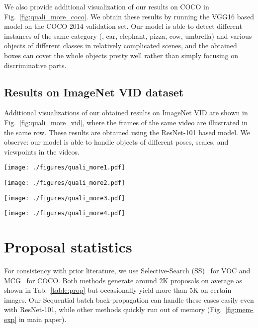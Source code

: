 \documentclass[10pt,twocolumn,letterpaper]{article}
\begin{document}
We also provide additional visualization of our results on COCO in Fig.~\ref{fig:quali_more_coco}. We obtain these results by running the VGG16 based model on the COCO 2014 validation set. Our model is able to detect different instances of the same category (\eg, car, elephant, pizza, cow, umbrella) and various objects of different classes in relatively complicated scenes, and the obtained boxes can cover the whole objects pretty well rather than simply focusing on discriminative parts.

\subsection{Results on ImageNet VID dataset}
Additional visualizations of our obtained results on ImageNet VID are shown in Fig.~\ref{fig:quali_more_vid}, where the frames of the same video are illustrated in the same row. These results are obtained using the ResNet-101 based model. We observe: our model is able to handle objects of different poses, scales, and viewpoints in the videos. 

\begin{figure*}[t]
\centering
\texttt{[image: ./figures/quali\_more1.pdf]}
\caption{Examples that highlight cases of `Instance Ambiguity'. For every pair: baseline (left) and our model (right).}
\label{fig:quali_more_inst}
\end{figure*}

\begin{figure*}[t]
\centering
\texttt{[image: ./figures/quali\_more2.pdf]}
\caption{Examples that highlight cases of `Part Domination'. For every pair: baseline (left) and our model (right).}
\label{fig:quali_more_part}
\end{figure*}

\begin{figure*}[t]
\centering
\texttt{[image: ./figures/quali\_more3.pdf]}
\caption{Additional visualization results of the proposed method on the COCO2014 validation set.}
\label{fig:quali_more_coco}
\end{figure*}

\begin{figure*}[t]
\centering
\texttt{[image: ./figures/quali\_more4.pdf]}
\caption{Additional visualization results of the proposed method on the ImageNet VID validation set.}
\label{fig:quali_more_vid}
\end{figure*}

\section{Proposal statistics}
For consistency with prior literature, we use Selective-Search (SS)~\cite{ss} for VOC and MCG~\cite{mcg} for COCO. Both methods generate around 2K proposals on average as shown in Tab.~\ref{table:prop} but occasionally yield more than 5K on certain images. Our Sequential batch back-propagation can handle these cases easily even with ResNet-101, while other methods quickly run out of memory (Fig.~\ref{fig:mem-exp} in main paper). 
\end{document}
